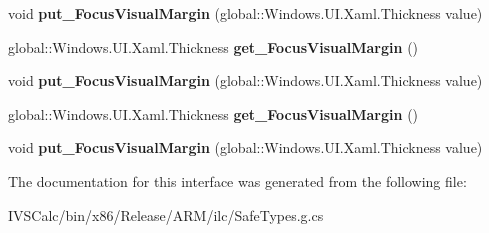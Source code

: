 \begin{DoxyCompactItemize}
\mbox{\label{interface_windows_1_1_u_i_1_1_xaml_1_1_i_framework_element4_ad74eefb3c93e1c409adfedeb3a033b87}} 
void {\bfseries put\+\_\+\+Focus\+Visual\+Margin} (global\+::\+Windows.\+U\+I.\+Xaml.\+Thickness value)
\item 
\mbox{\label{interface_windows_1_1_u_i_1_1_xaml_1_1_i_framework_element4_adf34a86a4339f6776906c515ed1588ee}} 
global\+::\+Windows.\+U\+I.\+Xaml.\+Thickness {\bfseries get\+\_\+\+Focus\+Visual\+Margin} ()
\item 
\mbox{\label{interface_windows_1_1_u_i_1_1_xaml_1_1_i_framework_element4_ad74eefb3c93e1c409adfedeb3a033b87}} 
void {\bfseries put\+\_\+\+Focus\+Visual\+Margin} (global\+::\+Windows.\+U\+I.\+Xaml.\+Thickness value)
\item 
\mbox{\label{interface_windows_1_1_u_i_1_1_xaml_1_1_i_framework_element4_adf34a86a4339f6776906c515ed1588ee}} 
global\+::\+Windows.\+U\+I.\+Xaml.\+Thickness {\bfseries get\+\_\+\+Focus\+Visual\+Margin} ()
\item 
\mbox{\label{interface_windows_1_1_u_i_1_1_xaml_1_1_i_framework_element4_ad74eefb3c93e1c409adfedeb3a033b87}} 
void {\bfseries put\+\_\+\+Focus\+Visual\+Margin} (global\+::\+Windows.\+U\+I.\+Xaml.\+Thickness value)
\end{DoxyCompactItemize}


The documentation for this interface was generated from the following file\+:\begin{DoxyCompactItemize}
\item 
I\+V\+S\+Calc/bin/x86/\+Release/\+A\+R\+M/ilc/Safe\+Types.\+g.\+cs\end{DoxyCompactItemize}
